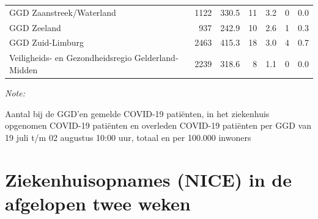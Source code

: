 \documentclass[
  english,
  man,floatsintext]{apa6}
\begin{document}
\begin{table}
\begin{threeparttable}
\begin{tabular}{lrrrrrr}
GGD Zaanstreek/Waterland & 1122 & 330.5 & 11 & 3.2 & 0 & 0.0\\
GGD Zeeland & 937 & 242.9 & 10 & 2.6 & 1 & 0.3\\
GGD Zuid-Limburg & 2463 & 415.3 & 18 & 3.0 & 4 & 0.7\\
Veiligheids- en Gezondheidsregio Gelderland-Midden & 2239 & 318.6 & 8 & 1.1 & 0 & 0.0\\
\bottomrule
\end{tabular}
\begin{tablenotes}
\item \textit{Note: } 
\item Aantal bij de GGD’en gemelde COVID-19 patiënten, in het ziekenhuis opgenomen COVID-19 patiënten en overleden COVID-19 patiënten per GGD van 19 juli t/m 02 augustus 10:00 uur, totaal en per 100.000 inwoners
\end{tablenotes}
\end{threeparttable}
\endgroup{}
\end{table}

\newpage

\hypertarget{ziekenhuisopnames-nice-in-de-afgelopen-twee-weken}{%
\section{Ziekenhuisopnames (NICE) in de afgelopen twee weken}\label{ziekenhuisopnames-nice-in-de-afgelopen-twee-weken}}
\end{document}
